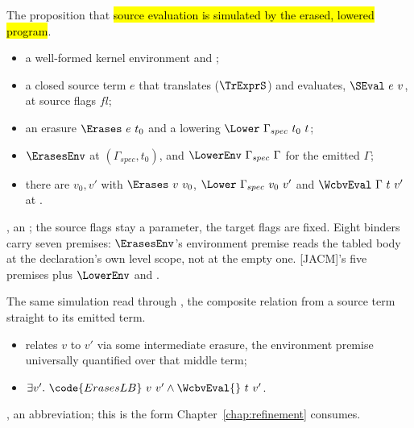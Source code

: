 \begin{definition}
\label{def:ErasesCorrectStmt}
\leanok
{}
 The proposition that \hl{source evaluation is simulated by the erased, lowered program}.
\begin{itemize}
\item {} a well-formed kernel environment and ;
\item a closed source term $e$ that translates ($\TrExprS$) and evaluates, $\SEval\ e\ v$, at source flags $fl$;
\item an erasure $\Erases\ e\ t_0$ and a lowering $\Lower\ \Gamma_{spec}\ t_0\ t$;
\item $\ErasesEnv$ at $(\Gamma_{spec}, t_0)$, and $\LowerEnv\ \Gamma_{spec}\ \Gamma$ for the emitted $\Gamma$;
\item {} there are $v_0, v'$ with $\Erases\ v\ v_0$, $\Lower\ \Gamma_{spec}\ v_0\ v'$ and
      $\WcbvEval\ \Gamma\ t\ v'$ at .
\end{itemize}
 , an ; the source flags stay a parameter, the target
flags are fixed. Eight binders carry seven premises: $\ErasesEnv$'s environment premise reads the tabled
body at the declaration's own level scope, not at the empty one.
 [JACM]'s five premises plus $\LowerEnv$ and .
\end{definition}

\begin{definition}
\label{def:ErasesCorrectLBStmt}
\leanok
{}
 The same simulation read through \hl{}, the composite relation from a
source term straight to its emitted \lbox{} term.
\begin{itemize}
\item {}  relates $v$ to $v'$ via some intermediate erasure, the environment
premise universally quantified over that middle term;
\item {} $\exists v'.\ \code{ErasesLB}\ v\ v' \wedge \WcbvEval{}\ t\ v'$.
\end{itemize}
 , an abbreviation; this is the form Chapter~\ref{chap:refinement} consumes.
\end{definition}

